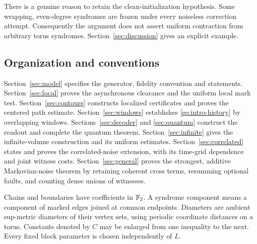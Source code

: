 There is a genuine reason to retain the clean-initialization
hypothesis. Some wrapping, even-degree syndromes are frozen under
every noiseless correction attempt. Consequently the argument does
not assert uniform contraction from arbitrary torus syndromes.
Section~\ref{sec:discussion} gives an explicit example.

\subsection{Organization and conventions}

Section~\ref{sec:model} specifies the generator, fidelity convention and
statements. Section~\ref{sec:local} proves the asynchronous clearance
and the uniform local mark test. Section~\ref{sec:contours} constructs
localized certificates and proves the centered path estimate.
Section~\ref{sec:windows} establishes
\eqref{eq:intro-history} by overlapping windows.
Sections~\ref{sec:decoder} and \ref{sec:quantum} construct the readout and
complete the quantum theorem. Section~\ref{sec:infinite} gives the
infinite-volume construction and its uniform estimates.
Section~\ref{sec:correlated} states and proves the correlated-noise
extension, with its time-grid dependence and joint witness costs.
Section~\ref{sec:general} proves the strongest, additive Markovian-noise
theorem by retaining coherent cross terms, resumming optional faults,
and counting dense unions of witnesses.

Chains and boundaries have coefficients in \(\mathbb F_2\). A syndrome component
means a component of marked edges joined at common endpoints.
Diameters are ambient sup-metric diameters of their vertex sets, using
periodic coordinate distances on a torus. Constants denoted by \(C\)
may be enlarged from one inequality to the next. Every fixed block
parameter is chosen independently of \(L\).
